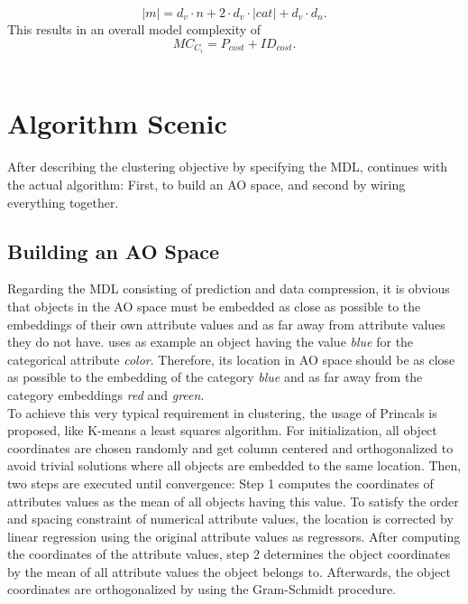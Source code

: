 \documentclass[conference]{IEEEtran}
\begin{document}
\begin{equation*}
|m| = d_v \cdot n + 2 \cdot d_v \cdot |cat| + d_v \cdot d_n.
\end{equation*} 
This results in an overall model complexity  of 
\begin{equation*}
MC_{C_i} = P_{cost} + ID_{cost}.
\end{equation*}
\\
\section{Algorithm Scenic}
After describing the clustering objective by specifying the MDL, \cite{scenic} continues with the actual algorithm: First, to build an AO space, and second by wiring everything together. 

\subsection{Building an AO Space}
Regarding the MDL consisting of prediction and data compression, it is obvious that objects in the AO space must be embedded as close as possible to the embeddings of their own attribute values and as far away from attribute values they do not have. \cite{scenic} uses as example an object having the value \textit{blue} for the categorical attribute \textit{color}. Therefore, its location in AO space should be as close as possible to the embedding of the category \textit{blue} and as far away from the category embeddings \textit{red} and \textit{green}. 
\\
To achieve this very typical requirement in clustering, the usage of Princals\cite{gliffy} is proposed, like K-means a least squares algorithm. For initialization, all object coordinates are chosen randomly and get column centered and orthogonalized to avoid trivial solutions where all objects are embedded to the same location. Then, two steps are executed until convergence: Step 1 computes the coordinates of attributes values as the mean of all objects having this value. To satisfy the order and spacing constraint of numerical attribute values, the location is corrected by linear regression using the original attribute values as regressors. After computing the coordinates of the attribute values, step 2 determines the object coordinates by the mean of all attribute values the object belongs to. Afterwards, the object coordinates are orthogonalized by using the Gram-Schmidt procedure.
\end{document}
